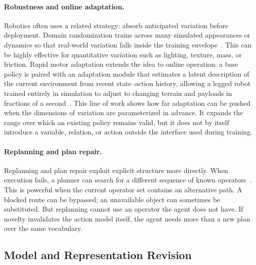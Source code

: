 \paragraph{Robustness and online adaptation.}
Robotics often uses a related strategy: absorb anticipated variation before deployment.
Domain randomization trains across many simulated appearances or dynamics so that real-world variation falls inside the training envelope~\citep{tobin2017domain,peng2018sim}.
This can be highly effective for quantitative variation such as lighting, texture, mass, or friction.
Rapid motor adaptation extends the idea to online operation: a base policy is paired with an adaptation module that estimates a latent description of the current environment from recent state--action history, allowing a legged robot trained entirely in simulation to adjust to changing terrain and payloads in fractions of a second~\citep{kumar2021rma}.
This line of work shows how far adaptation can be pushed when the dimensions of variation are parameterized in advance.
It expands the range over which an existing policy remains valid, but it does not by itself introduce a variable, relation, or action outside the interface used during training.

\paragraph{Replanning and plan repair.}
Replanning and plan repair exploit explicit structure more directly.
When execution fails, a planner can search for a different sequence of known operators~\citep{fox2006plan,fritz2007monitoring}.
This is powerful when the current operator set contains an alternative path.
A blocked route can be bypassed; an unavailable object can sometimes be substituted.
But replanning cannot use an operator the agent does not have.
If novelty invalidates the action model itself, the agent needs more than a new plan over the same vocabulary.

\subsection{Model and Representation Revision}
\label{sec:extend_representation_methods}

